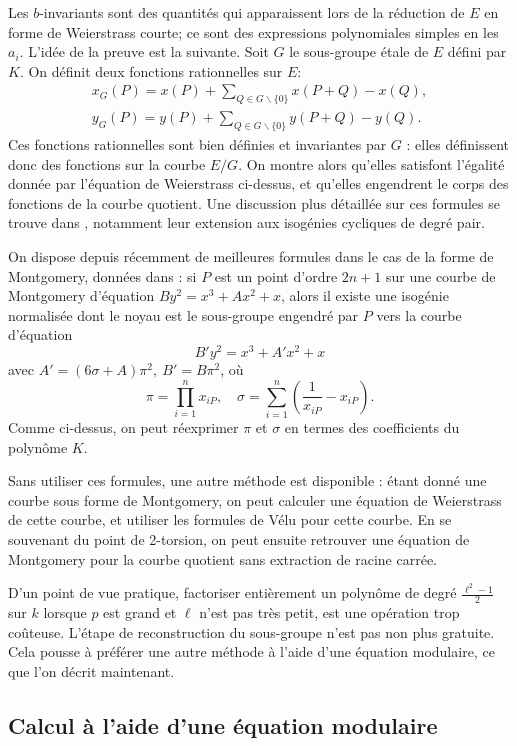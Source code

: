 \documentclass[11pt,a4paper]{article}
\renewcommand{\v}{\vspace{5mm}}
\theoremstyle{definition}
\begin{document}
Les $b$-invariants sont des quantités qui apparaissent lors de la réduction de $E$ en forme de Weierstrass courte; ce sont des expressions polynomiales simples en les $a_i$. L'idée de la preuve est la suivante.
Soit $G$ le sous-groupe étale de $E$ défini par $K$. On définit deux fonctions rationnelles sur $E$:
$$\begin{aligned}
x_G(P) = x(P) + \sum_{Q\in G\backslash \{0\}} x(P+Q) - x(Q),\\
y_G(P) = y(P) + \sum_{Q\in G\backslash \{0\}} y(P+Q) - y(Q).
\end{aligned}$$
Ces fonctions rationnelles sont bien définies et invariantes par $G$ : elles définissent donc des fonctions sur la courbe $E/G$. On montre alors qu'elles satisfont l'égalité donnée par l'équation de Weierstrass ci-dessus, et qu'elles engendrent le corps des fonctions de la courbe quotient.
Une discussion plus détaillée sur ces formules se trouve dans \cite{Kohel}, notamment leur extension aux isogénies cycliques de degré pair.

\v
On dispose depuis récemment de meilleures formules dans le cas de la forme de Montgomery, données dans \cite{VeluMontgomery}: si $P$ est un point d'ordre $2n+1$ sur une courbe de Montgomery d'équation $By^2 = x^3 + Ax^2 + x$, alors il existe une isogénie normalisée dont le noyau est le sous-groupe engendré par $P$ vers la courbe d'équation
$$B'y^2 = x^3 + A'x^2 + x$$
avec $A' = (6\sigma + A)\pi^2,\ B' = B\pi^2$, où
$$
\pi = \prod_{i = 1}^n x_{iP}, \quad
\sigma = \sum_{i = 1}^n \left(\frac{1}{x_{iP}} - x_{iP}\right).
$$
Comme ci-dessus, on peut réexprimer $\pi$ et $\sigma$ en termes des coefficients du polynôme $K$.

Sans utiliser ces formules, une autre méthode est disponible : étant donné une courbe sous forme de Montgomery, on peut calculer une équation de Weierstrass de cette courbe, et utiliser les formules de Vélu pour cette courbe. En se souvenant du point de 2-torsion, on peut ensuite retrouver une équation de Montgomery pour la courbe quotient sans extraction de racine carrée.

\v
D'un point de vue pratique, factoriser entièrement un polynôme de degré $\frac{\ell^2 - 1}{2}$ sur $k$ lorsque $p$ est grand et $\ell$ n'est pas très petit, est une opération trop coûteuse. L'étape de reconstruction du sous-groupe n'est pas non plus gratuite.
Cela pousse à préférer une autre méthode à l'aide d'une équation modulaire, ce que l'on décrit maintenant.


\subsection{Calcul à l'aide d'une équation modulaire}
\end{document}
